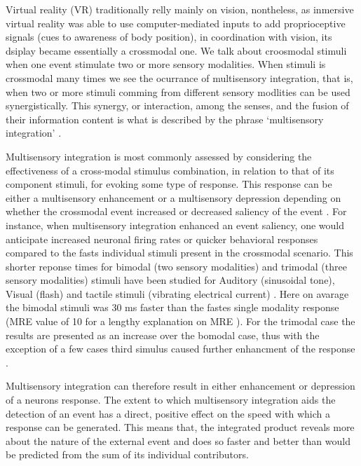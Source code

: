 \documentclass[12pt,oneside,openright]{report}
\begin{document}
Virtual reality (VR) traditionally relly mainly on vision, nontheless, as inmersive virtual reality was able to use computer-mediated inputs to add proprioceptive signals (cues to awareness of body position), in coordination with vision, its dsiplay became essentially a crossmodal one. We talk about croosmodal stimuli when one event stimulate two or more sensory modalities. When stimuli is crossmodal many times we see the ocurrance of multisensory integration, that is, when two or more stimuli comming from different sensory modlities can be used synergistically. This synergy, or interaction, among the senses, and the fusion of their information content is what is described by the phrase ‘multisensory integration’ \parencite{Stein2008MultisensoryIC}.

Multisensory integration is most commonly assessed by considering the effectiveness of a cross-modal stimulus combination, in relation to that of its component stimuli, for evoking some type of response. This response can be either a multisensory enhancement or a multisensory depression depending on whether the crossmodal event increased or decreased saliency of the event \parencite{Stein2008MultisensoryIC}. For instance, when multisensory integration enhanced an event saliency, one would anticipate increased neuronal firing rates or quicker behavioral responses compared to the fasts individual stimuli present in the crossmodal scenario. This shorter reponse times for bimodal (two sensory modalities) and trimodal (three sensory modalities) stimuli have been studied for Auditory (sinusoidal tone), Visual (flash) and tactile stimuli (vibrating electrical current) \parencite{Diederich2004BimodalAT}. Here on avarage the bimodal stimuli was 30 ms faster than the fastes single modality response (MRE value of 10 for a lengthy explanation on MRE \textcite{Diederich2004BimodalAT}). For the trimodal case the results are presented as an increase over the bomodal case, thus with the exception of a few cases third simulus caused further enhancment of the response \parencite{Diederich2004BimodalAT}. 

Multisensory integration can therefore result in either enhancement or depression of a neurons response. The extent to which multisensory integration aids the detection of an event has a direct, positive effect on the speed with which a response can be generated. 
This means that, the integrated product reveals more about the nature of the external event and does so faster and better than would be predicted from the sum of its individual contributors.
\end{document}

